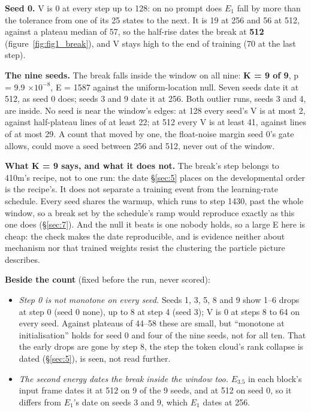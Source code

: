 \documentclass[11pt]{article}
\begin{document}
\textbf{Seed 0.} V is 0 at every step up to 128: on no prompt does $E_{1}$ fall by more than the tolerance from one of its 25 states to the next. It is 19 at 256 and 56 at 512, against a plateau median of 57, so the half-rise dates the break at \textbf{512} (figure~\ref{fig:fig1_break}), and V stays high to the end of training (70 at the last step).

\textbf{The nine seeds.} The break falls inside the window on all nine: \textbf{K = 9 of 9}, p = 9.9 $\times 10^{-8}$, E = 1587 against the uniform-location null. Seven seeds date it at 512, as seed 0 does; seeds 3 and 9 date it at 256. Both outlier runs, seeds 3 and 4, are inside. No seed is near the window's edges: at 128 every seed's V is at most 2, against half-plateau lines of at least 22; at 512 every V is at least 41, against lines of at most 29. A count that moved by one, the float-noise margin seed 0's gate allows, could move a seed between 256 and 512, never out of the window.

\textbf{What K = 9 says, and what it does not.} The break's step belongs to 410m's recipe, not to one run: the date \S\ref{sec:5} places on the developmental order is the recipe's. It does not separate a training event from the learning-rate schedule. Every seed shares the warmup, which runs to step 1430, past the whole window, so a break set by the schedule's ramp would reproduce exactly as this one does (\S\ref{sec:7}). And the null it beats is one nobody holds, so a large E here is cheap: the check makes the date reproducible, and is evidence neither about mechanism nor that trained weights resist the clustering the particle picture describes.

\textbf{Beside the count} (fixed before the run, never scored):

\begin{itemize}
  \item \emph{Step 0 is not monotone on every seed.} Seeds 1, 3, 5, 8 and 9 show 1--6 drops at step 0 (seed 0 none), up to 8 at step 4 (seed 3); V is 0 at steps 8 to 64 on every seed. Against plateaus of 44--58 these are small, but ``monotone at initialisation'' holds for seed 0 and four of the nine seeds, not for all ten. That the early drops are gone by step 8, the step the token cloud's rank collapse is dated (\S\ref{sec:5}), is seen, not read further.
  \item \emph{The second energy dates the break inside the window too.} $E_{3.5}$ in each block's input frame dates it at 512 on 9 of the 9 seeds, and at 512 on seed 0, so it differs from $E_{1}$'s date on seeds 3 and 9, which $E_{1}$ dates at 256.
\end{itemize}
\end{document}
